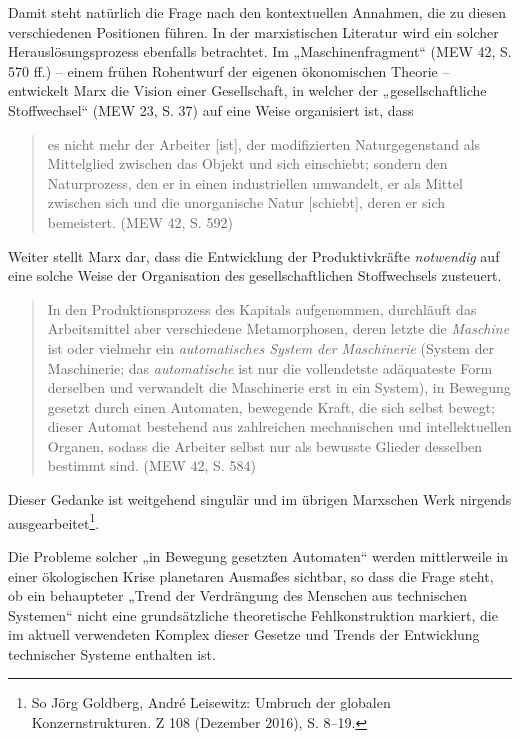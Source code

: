 \documentclass[11pt,a4paper]{article}
\begin{document}
Damit steht natürlich die Frage nach den kontextuellen Annahmen, die zu diesen
verschiedenen Positionen führen. In der marxistischen Literatur wird ein
solcher Herauslösungsprozess ebenfalls betrachtet.  Im „Maschinenfragment“
(MEW 42, S. 570 ff.) -- einem frühen Rohentwurf der eigenen ökonomischen
Theorie -- entwickelt Marx die Vision einer Gesellschaft, in welcher der
„gesellschaftliche Stoffwechsel“ (MEW 23, S. 37) auf eine Weise organisiert
ist, dass
\begin{quote}
  es nicht mehr der Arbeiter [ist], der modifizierten Naturgegenstand als
  Mittelglied zwischen das Objekt und sich einschiebt; sondern den
  Naturprozess, den er in einen industriellen umwandelt, er als Mittel zwischen
  sich und die unorganische Natur [schiebt], deren er sich bemeistert. (MEW 42,
  S. 592)
\end{quote}
Weiter stellt Marx dar, dass die Entwicklung der Produktivkräfte
\emph{notwendig} auf eine solche Weise der Organisation des gesellschaftlichen
Stoffwechsels zusteuert.
\begin{quote}
  In den Produktionsprozess des Kapitals aufgenommen, durchläuft das
  Arbeitsmittel aber verschiedene Metamorphosen, deren letzte die
  \emph{Maschine} ist oder vielmehr ein \emph{automatisches System der
    Maschinerie} (System der Maschinerie; das \emph{automatische} ist nur die
  vollendetste adäquateste Form derselben und verwandelt die Maschinerie erst
  in ein System), in Bewegung gesetzt durch einen Automaten, bewegende Kraft,
  die sich selbst bewegt; dieser Automat bestehend aus zahlreichen mechanischen
  und intellektuellen Organen, sodass die Arbeiter selbst nur als bewusste
  Glieder desselben bestimmt sind. (MEW 42, S. 584)
\end{quote}
Dieser Gedanke ist weitgehend singulär und im übrigen Marxschen Werk nirgends
ausgearbeitet\footnote{So Jörg Goldberg, André Leisewitz: Umbruch der globalen
  Konzernstrukturen. Z 108 (Dezember 2016), S. 8--19.}.

Die Probleme solcher „in Bewegung gesetzten Automaten“ werden mittlerweile in
einer ökolo\-gischen Krise planetaren Ausmaßes sichtbar, so dass die Frage
steht, ob ein behaupteter „Trend der Verdrängung des Menschen aus technischen
Systemen“ nicht eine grundsätzliche theoretische Fehlkonstruktion markiert,
die im aktuell verwendeten Komplex dieser Gesetze und Trends der Entwicklung
technischer Systeme enthalten ist. 
\end{document}
